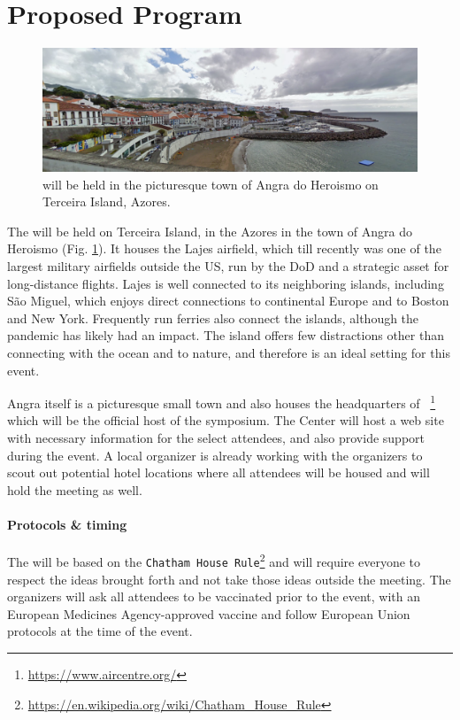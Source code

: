 \section{Proposed Program}
\label{sec:pgm}

\begin{figure}[!h]
  \centering
  \includegraphics[scale=0.5]{fig/angra.png}
  \caption{\symp will be held in the picturesque town of Angra do
    Heroismo on Terceira Island, Azores.}
  \label{fig:angra}
\end{figure}

The \symp will be held on Terceira Island, in the Azores in the town of
Angra do Heroismo (Fig. \ref{fig:angra}). It houses the Lajes airfield,
which till recently was one of the largest military airfields outside
the US, run by the DoD and a strategic asset for long-distance
flights. Lajes is well connected to its neighboring islands, including
S\~{a}o Miguel, which enjoys direct connections to continental Europe
and to Boston and New York. Frequently run ferries also connect the
islands, although the pandemic has likely had an impact. The island
offers few distractions other than connecting with the ocean and to
nature, and therefore is an ideal setting for this event.

Angra itself is a picturesque small town and also houses the
headquarters of \aire~\footnote{\url{https://www.aircentre.org/}} which
will be the official host of the symposium. The Center will host a web
site with necessary information for the select attendees, and also
provide support during the event. A local organizer is already working
with the organizers to scout out potential hotel locations where all
attendees will be housed and will hold the meeting as well. 

\paragraph{Protocols \& timing} The \symp will be based on the
\texttt{Chatham House
  Rule}\footnote{\url{https://en.wikipedia.org/wiki/Chatham_House_Rule}}
and will require everyone to respect the ideas brought forth and not
take those ideas outside the meeting.  The organizers will ask all
attendees to be vaccinated prior to the event, with an European
Medicines Agency-approved vaccine and follow European Union protocols
at the time of the event.

